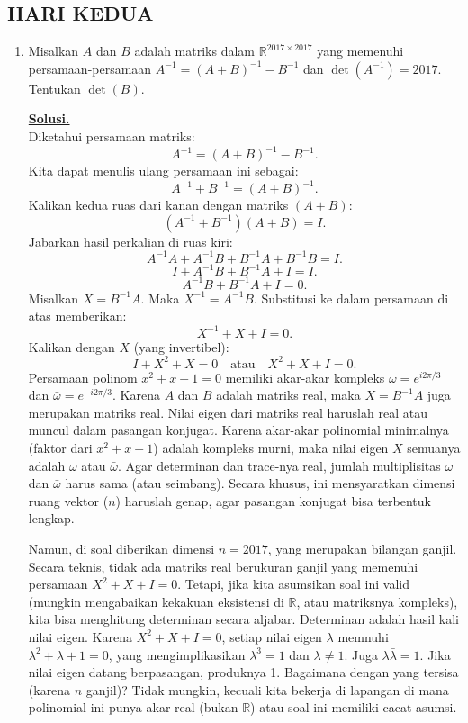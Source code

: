 \documentclass[12pt,twoside]{article}
\newenvironment{solution}
{
	\par\noindent\textbf{\underline{Solusi.}}\\
}
{
	\par
}
\begin{document}
\subsection{HARI KEDUA}
\begin{enumerate}
  \item Misalkan $A$ dan $B$ adalah matriks dalam $\mathbb{R}^{2017\times2017}$ yang memenuhi persamaan-persamaan $A^{-1} = (A+B)^{-1}-B^{-1}$	dan $\det(A^{-1}) = 2017$. Tentukan $\det(B)$.
        \begin{solution}
          Diketahui persamaan matriks:
          \[ A^{-1} = (A+B)^{-1} - B^{-1}. \]
          Kita dapat menulis ulang persamaan ini sebagai:
          \[ A^{-1} + B^{-1} = (A+B)^{-1}. \]
          Kalikan kedua ruas dari kanan dengan matriks $(A+B)$:
          \[ (A^{-1} + B^{-1})(A+B) = I. \]
          Jabarkan hasil perkalian di ruas kiri:
          \[ A^{-1}A + A^{-1}B + B^{-1}A + B^{-1}B = I. \]
          \[ I + A^{-1}B + B^{-1}A + I = I. \]
          \[ A^{-1}B + B^{-1}A + I = 0. \]
          Misalkan $X = B^{-1}A$. Maka $X^{-1} = A^{-1}B$.
          Substitusi ke dalam persamaan di atas memberikan:
          \[ X^{-1} + X + I = 0. \]
          Kalikan dengan $X$ (yang invertibel):
          \[ I + X^2 + X = 0 \quad \text{atau} \quad X^2 + X + I = 0. \]
          Persamaan polinom $x^2 + x + 1 = 0$ memiliki akar-akar kompleks $\omega = e^{i 2\pi/3}$ dan $\bar{\omega} = e^{-i 2\pi/3}$.
          Karena $A$ dan $B$ adalah matriks real, maka $X = B^{-1}A$ juga merupakan matriks real.
          Nilai eigen dari matriks real haruslah real atau muncul dalam pasangan konjugat.
          Karena akar-akar polinomial minimalnya (faktor dari $x^2+x+1$) adalah kompleks murni, maka nilai eigen $X$ semuanya adalah $\omega$ atau $\bar{\omega}$.
          Agar determinan dan trace-nya real, jumlah multiplisitas $\omega$ dan $\bar{\omega}$ harus sama (atau seimbang).
          Secara khusus, ini mensyaratkan dimensi ruang vektor ($n$) haruslah genap, agar pasangan konjugat bisa terbentuk lengkap.

          Namun, di soal diberikan dimensi $n = 2017$, yang merupakan bilangan ganjil.
          Secara teknis, tidak ada matriks real berukuran ganjil yang memenuhi persamaan $X^2+X+I=0$.
          Tetapi, jika kita asumsikan soal ini valid (mungkin mengabaikan kekakuan eksistensi di $\mathbb{R}$, atau matriksnya kompleks), kita bisa menghitung determinan secara aljabar.
          Determinan adalah hasil kali nilai eigen.
          Karena $X^2+X+I=0$, setiap nilai eigen $\lambda$ memnuhi $\lambda^2+\lambda+1=0$, yang mengimplikasikan $\lambda^3 = 1$ dan $\lambda \neq 1$.
          Juga $\lambda \bar{\lambda} = 1$.
          Jika nilai eigen datang berpasangan, produknya 1.
          Bagaimana dengan yang tersisa (karena $n$ ganjil)?
          Tidak mungkin, kecuali kita bekerja di lapangan di mana polinomial ini punya akar real (bukan $\mathbb{R}$) atau soal ini memiliki cacat asumsi.


\end{solution}
\end{enumerate}
\end{document}
